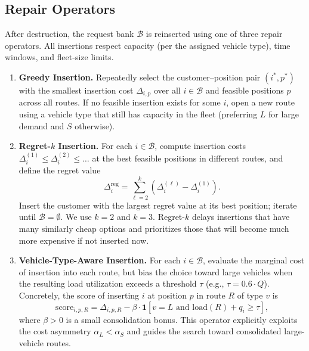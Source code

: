 \documentclass[11pt]{article}
\begin{document}
\subsection{Repair Operators}
\label{sec:repair}

After destruction, the request bank $\mathcal{B}$ is reinserted using one of three repair operators. All insertions respect capacity (per the assigned vehicle type), time windows, and fleet-size limits.

\begin{enumerate}[leftmargin=*]
    \item \textbf{Greedy Insertion.} Repeatedly select the customer--position pair $(i^*, p^*)$ with the smallest insertion cost $\Delta_{i,p}$ over all $i \in \mathcal{B}$ and feasible positions $p$ across all routes. If no feasible insertion exists for some $i$, open a new route using a vehicle type that still has capacity in the fleet (preferring $L$ for large demand and $S$ otherwise).
    \item \textbf{Regret-$k$ Insertion.} For each $i \in \mathcal{B}$, compute insertion costs $\Delta^{(1)}_i \leq \Delta^{(2)}_i \leq \ldots$ at the best feasible positions in different routes, and define the regret value
    \begin{equation}
    \Delta^{\mathrm{reg}}_i = \sum_{\ell=2}^{k} \left( \Delta^{(\ell)}_i - \Delta^{(1)}_i \right).
    \end{equation}
    Insert the customer with the largest regret value at its best position; iterate until $\mathcal{B} = \emptyset$. We use $k = 2$ and $k = 3$. Regret-$k$ delays insertions that have many similarly cheap options and prioritizes those that will become much more expensive if not inserted now.
    \item \textbf{Vehicle-Type-Aware Insertion.} For each $i \in \mathcal{B}$, evaluate the marginal cost of insertion into each route, but bias the choice toward large vehicles when the resulting load utilization exceeds a threshold $\tau$ (e.g., $\tau = 0.6 \cdot Q$). Concretely, the score of inserting $i$ at position $p$ in route $R$ of type $v$ is
    \begin{equation}
    \mathrm{score}_{i,p,R} = \Delta_{i,p,R} - \beta \cdot \mathbf{1}[v = L \text{ and } \mathrm{load}(R) + q_i \geq \tau],
    \end{equation}
    where $\beta > 0$ is a small consolidation bonus. This operator explicitly exploits the cost asymmetry $\alpha_L < \alpha_S$ and guides the search toward consolidated large-vehicle routes.
\end{enumerate}
\end{document}
